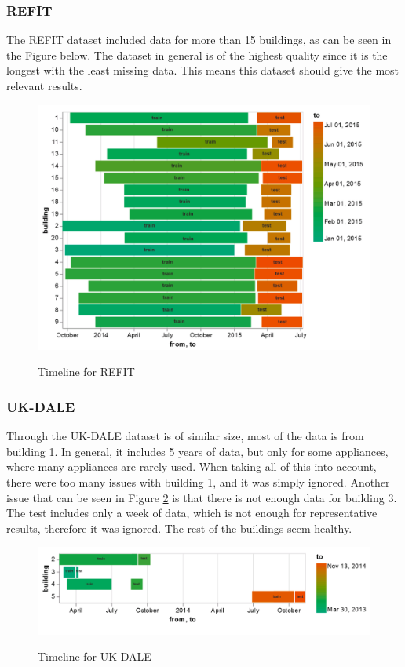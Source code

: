 \subsubsection{REFIT}
The REFIT \cite{REFIT} dataset included data for more than 15 buildings, as can be seen in the Figure below.
The dataset in general is of the highest quality since it is the longest with the least missing data.
This means this dataset should give the most relevant results.
\begin{figure}[H]
	\centering
	\caption{Timeline for REFIT}
	\includegraphics[width=1\textwidth]{Figures/EC/refit_timeline.png}
	\label{fig:refit_timeline}
\end{figure}

\subsubsection{UK-DALE} 

Through the UK-DALE \cite{UKDALE} dataset is of similar size, most of the data is from building 1.
In general, it includes 5 years of data, but only for some appliances, where many appliances are rarely used.
When taking all of this into account, there were too many issues with building 1, and it was simply ignored.
Another issue that can be seen in Figure \ref{fig:ukdale_timeline} is that there is not enough data for 
building 3. The test includes only a week of data, which is not enough for representative results, therefore it was ignored.
The rest of the buildings seem healthy.

\begin{figure}[H]
	\centering
	\caption{Timeline for UK-DALE}
	\includegraphics[width=1\textwidth]{Figures/EC/ukdale_timeline.png}
	\label{fig:ukdale_timeline}
\end{figure}

